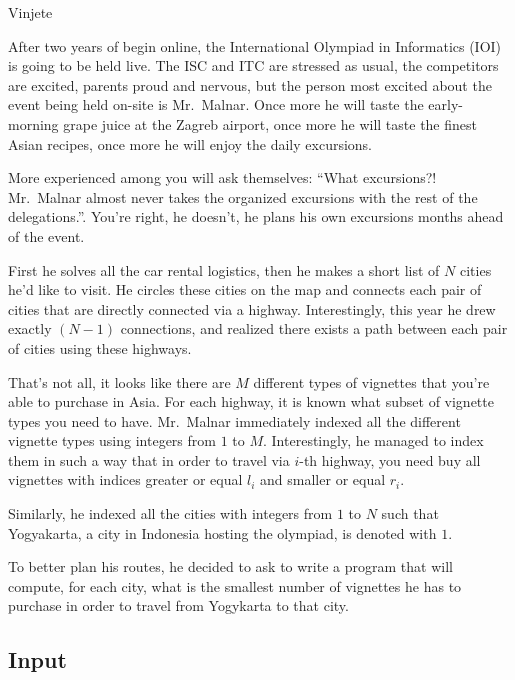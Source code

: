 \begin{statement}[
  problempoints=100,
  timelimit=3 seconds,
  memorylimit=512 MiB,
]{Vinjete}

After two years of begin online, the International Olympiad in Informatics
(IOI) is going to be held live. The ISC and ITC are stressed as usual, the
competitors are excited, parents proud and nervous, but the person most
excited about the event being held on-site is Mr.\ Malnar. Once more he will
taste the early-morning grape juice at the Zagreb airport, once more he will
taste the finest Asian recipes, once more he will enjoy the daily excursions.

More experienced among you will ask themselves: ``What excursions?! Mr.\ Malnar
almost never takes the organized excursions with the rest of the delegations.''.
You're right, he doesn't, he plans his own excursions months ahead of the event.

First he solves all the car rental logistics, then he makes a short list of $N$
cities he'd like to visit. He circles these cities on the map and connects each
pair of cities that are directly connected via a highway. Interestingly, this
year he drew exactly $(N-1)$ connections, and realized there exists a path
between each pair of cities using these highways.

That's not all, it looks like there are $M$ different types of vignettes that
you're able to purchase in Asia. For each highway, it is known what subset of
vignette types you need to have. Mr.\ Malnar immediately indexed all the
different vignette types using integers from $1$ to $M$. Interestingly, he
managed to index them in such a way that in order to travel via $i$-th
highway, you need buy all vignettes with indices greater or equal $l_i$ and
smaller or equal $r_i$.

Similarly, he indexed all the cities with integers from $1$ to $N$ such that
Yogyakarta, a city in Indonesia hosting the olympiad, is denoted with $1$.

To better plan his routes, he decided to ask to write a program that will
compute, for each city, what is the smallest number of vignettes he has
to purchase in order to travel from Yogykarta to that city.

\subsection*{Input}


\end{statement}
